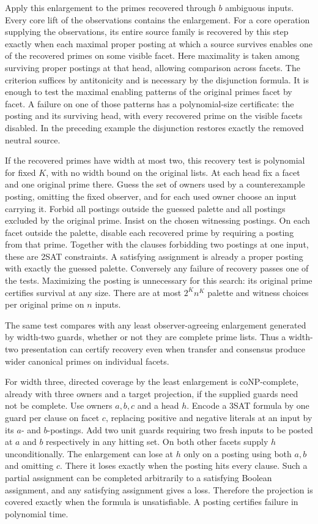 Apply this enlargement to the primes recovered through
$b$ ambiguous inputs. Every core lift of the observations
contains the enlargement. For a core operation supplying
the observations, its entire source family is recovered
by this step exactly when each maximal proper posting
at which a source survives enables one of the recovered
primes on some visible facet. Here maximality is taken
among surviving proper postings at that head, allowing
comparison across facets. The criterion suffices by
antitonicity and is necessary by the disjunction formula.
It is enough to test the maximal enabling patterns of
the original primes facet by facet. A failure on one
of those patterns has a polynomial-size certificate:
the posting and its surviving head, with every recovered
prime on the visible facets disabled. In the preceding
example the disjunction restores exactly the removed
neutral source.

If the recovered primes have width at most two, this
recovery test is polynomial for fixed $K$, with no width
bound on the original lists. At each head fix a facet and
one original prime there. Guess the set of owners used
by a counterexample posting, omitting the fixed observer,
and for each used owner choose an input carrying it.
Forbid all postings outside the guessed palette and all
postings excluded by the original prime. Insist on the
chosen witnessing postings. On each facet outside the
palette, disable each recovered prime by requiring a
posting from that prime. Together with the clauses
forbidding two postings at one input, these are 2SAT
constraints. A satisfying assignment is already a proper
posting with exactly the guessed palette. Conversely any
failure of recovery passes one of the tests. Maximizing
the posting is unnecessary for this search: its original
prime certifies survival at any size. There are at most
$2^K n^K$ palette and witness choices per original prime
on $n$ inputs.

The same test compares with any least observer-agreeing
enlargement generated by width-two guards, whether or
not they are complete prime lists. Thus a width-two
presentation can certify recovery even when transfer and
consensus produce wider canonical primes on individual facets.

For width three, directed coverage by the least enlargement
is coNP-complete, already with three owners and a target
projection, if the supplied guards need not be complete.
Use owners $a,b,c$ and a head $h$. Encode a 3SAT formula by
one guard per clause on facet $c$, replacing positive and
negative literals at an input by its $a$- and $b$-postings.
Add two unit guards requiring two fresh inputs to be posted
at $a$ and $b$ respectively in any hitting set. On both
other facets supply $h$ unconditionally. The enlargement
can lose at $h$ only on a posting using both $a,b$ and
omitting $c$. There it loses exactly when the posting
hits every clause. Such a partial assignment can be
completed arbitrarily to a satisfying Boolean assignment,
and any satisfying assignment gives a loss. Therefore the
projection is covered exactly when the formula is
unsatisfiable. A posting certifies failure in polynomial
time.

